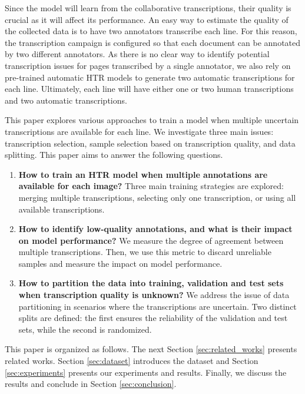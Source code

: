 \documentclass[sigconf]{acmart}
\begin{document}
Since the model will learn from the collaborative transcriptions, their quality is crucial as it will affect its performance. An easy way to estimate the quality of the collected data is to have two annotators transcribe each line. For this reason, the transcription campaign is configured so that each document can be annotated by two different annotators. As there is no clear way to identify potential transcription issues for pages transcribed by a single annotator, we also rely on pre-trained automatic HTR models to generate two automatic transcriptions for each line. Ultimately, each line will have either one or two human transcriptions and two automatic transcriptions.

This paper explores various approaches to train a model when multiple uncertain transcriptions are available for each line. We investigate three main issues: transcription selection, sample selection based on transcription quality, and data splitting. This paper aims to answer the following questions.

\begin{enumerate}
    \item \textbf{How to train an HTR model when multiple annotations are available for each image?} Three main training strategies are explored: merging multiple transcriptions, selecting only one transcription, or using all available transcriptions.  
    \item \textbf{How to identify low-quality annotations, and what is their impact on model performance?} We measure the degree of agreement between multiple transcriptions. Then, we use this metric to discard unreliable samples and measure the impact on model performance.
    \item \textbf{How to partition the data into training, validation and test sets when transcription quality is unknown?} We address the issue of data partitioning in scenarios where the transcriptions are uncertain. Two distinct splits are defined: the first ensures the reliability of the validation and test sets, while the second is randomized.
\end{enumerate}




This paper is organized as follows. The next Section \ref{sec:related_works} presents related works. Section \ref{sec:dataset} introduces the dataset and Section \ref{sec:experiments} presents our experiments and results. Finally, we discuss the results and conclude in Section \ref{sec:conclusion}.
\end{document}
